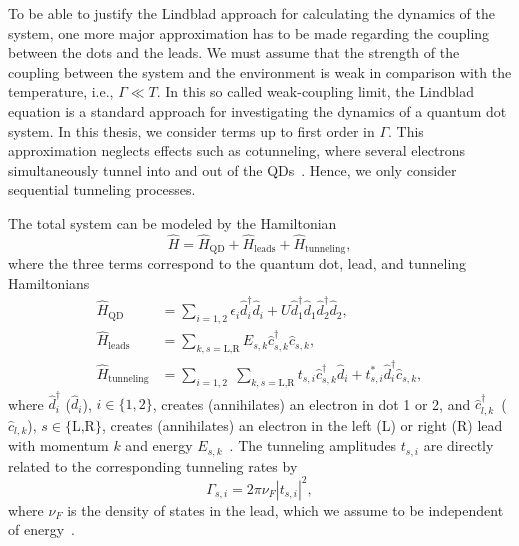 \documentclass[../main.tex]{subfiles}
\begin{document}
To be able to justify the Lindblad approach for calculating the dynamics of the system, one more major approximation has to be made regarding the coupling between the dots and the leads. We must assume that the strength of the coupling between the system and the environment is weak in comparison with the temperature, i.e., $\Gamma \ll T$. In this so called weak-coupling limit, the Lindblad equation is a standard approach for investigating the dynamics of a quantum dot system. In this thesis, we consider terms up to first order in $\Gamma$. This approximation neglects effects such as cotunneling, where several electrons simultaneously tunnel into and out of the QDs~\cite{doubledot}. Hence, we only consider sequential tunneling processes.

The total system can be modeled by the Hamiltonian
\begin{equation}
    \hat H = \hat H_\text{QD} + \hat H_\text{leads} + \hat H_\text{tunneling},
\end{equation}
where the three terms correspond to the quantum dot, lead, and tunneling Hamiltonians
\begin{equation}
    \begin{split}
        \hat H_\text{QD} &= \sum_{i=1,2} \epsilon_i \hat d_i^\dag \hat d_i  + U\hat d_1^\dag \hat d_1 \hat d_2^\dag \hat d_2, \\
        \hat H_\text{leads} &= \sum_{k,s=\text{L,R}} E_{s, k} \hat c_{s,k}^\dag \hat c_{s,k}, \\
        \hat H_\text{tunneling} &= \sum_{i=1,2} \; \sum_{k,s=\text{L,R}} t_{s,i} \hat c_{s,k}^\dag \hat d_i + t_{s,i}^* \hat d_i^\dag \hat c_{s,k},
    \end{split}
\end{equation}
where $\hat d_i^\dag$ ($\hat d_i$), $i\in\{1,2\}$, creates (annihilates) an electron in dot 1 or 2, and $\hat c_{l,k}^\dag$~($\hat c_{l,k}$), $s\in\{\text{L,R}\}$, creates (annihilates) an electron in the left (L) or right (R) lead with momentum $k$ and energy $E_{s,k}$~\cite{doubledot}. The tunneling amplitudes $t_{s,i}$ are directly related to the corresponding tunneling rates by 
\begin{equation}
    \Gamma_{s,i} = 2\pi\nu_F|t_{s,i}|^2,
\end{equation}
where $\nu_F$ is the density of states in the lead, which we assume to be independent of energy~\cite{perlind}.
\end{document}
